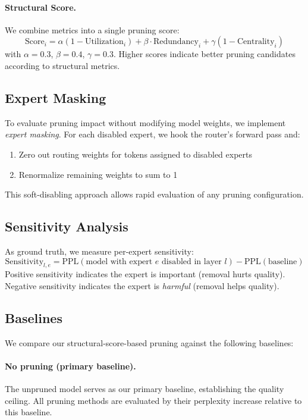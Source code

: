 \documentclass{article}
\begin{document}
\paragraph{Structural Score.}
We combine metrics into a single pruning score:
\begin{equation}
    \text{Score}_i = \alpha (1 - \text{Utilization}_i) + \beta \cdot \text{Redundancy}_i + \gamma (1 - \text{Centrality}_i)
\end{equation}
with $\alpha=0.3$, $\beta=0.4$, $\gamma=0.3$.
Higher scores indicate better pruning candidates according to structural metrics.

\subsection{Expert Masking}

To evaluate pruning impact without modifying model weights, we implement \emph{expert masking}.
For each disabled expert, we hook the router's forward pass and:
\begin{enumerate}
    \item Zero out routing weights for tokens assigned to disabled experts
    \item Renormalize remaining weights to sum to 1
\end{enumerate}
This soft-disabling approach allows rapid evaluation of any pruning configuration.

\subsection{Sensitivity Analysis}

As ground truth, we measure per-expert sensitivity:
\begin{equation}
    \text{Sensitivity}_{l,e} = \text{PPL}(\text{model with expert } e \text{ disabled in layer } l) - \text{PPL}(\text{baseline})
\end{equation}
Positive sensitivity indicates the expert is important (removal hurts quality).
Negative sensitivity indicates the expert is \emph{harmful} (removal helps quality).

\subsection{Baselines}

We compare our structural-score-based pruning against the following baselines:

\paragraph{No pruning (primary baseline).}
The unpruned model serves as our primary baseline, establishing the quality ceiling.
All pruning methods are evaluated by their perplexity increase relative to this baseline.
\end{document}
